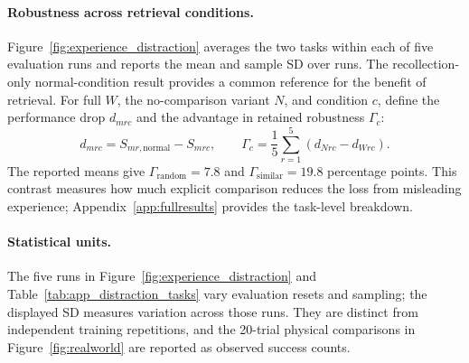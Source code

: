 \paragraph{Robustness across retrieval conditions.}
Figure~\ref{fig:experience_distraction} averages the two tasks within each of five evaluation runs and reports the mean and sample SD over runs.
The recollection-only normal-condition result provides a common reference for the benefit of retrieval.
For full \method{} $W$, the no-comparison variant $N$, and condition $c$, define the performance drop $d_{mrc}$ and the advantage in retained robustness $\Gamma_c$:
\begin{equation}
 d_{mrc}=S_{mr,\mathrm{normal}}-S_{mrc},\qquad
 \Gamma_c=\frac15\sum_{r=1}^{5}(d_{Nrc}-d_{Wrc}).
 \label{eq:exp_paired_drop}
\end{equation}
The reported means give $\Gamma_{\mathrm{random}}=7.8$ and $\Gamma_{\mathrm{similar}}=19.8$ percentage points.
This contrast measures how much explicit comparison reduces the loss from misleading experience; Appendix~\ref{app:fullresults} provides the task-level breakdown.

\paragraph{Statistical units.}
The five runs in Figure~\ref{fig:experience_distraction} and Table~\ref{tab:app_distraction_tasks} vary evaluation resets and sampling; the displayed SD measures variation across those runs.
They are distinct from independent training repetitions, and the 20-trial physical comparisons in Figure~\ref{fig:realworld} are reported as observed success counts.
